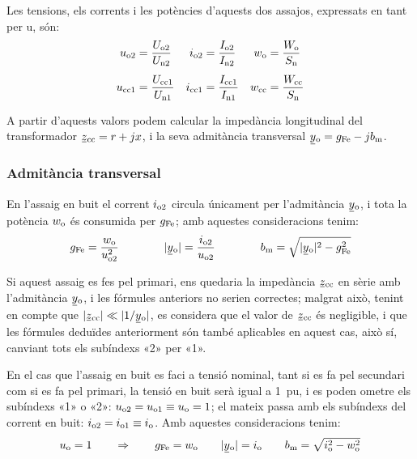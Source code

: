 Les tensions, els corrents i les potències d'aquests dos  assajos,
expressats en tant per u, són:
\begin{align}
    u_\mathrm{o2} &=\frac{U_\mathrm{o2}}{U_\mathrm{n2}} &
    i_\mathrm{o2} &=\frac{I_\mathrm{o2}}{I_\mathrm{n2}} &
    w_\mathrm{o}  &=\frac{W_\mathrm{o}}{S_\mathrm{n}} \\[1ex]
    u_\mathrm{cc1} &=\frac{U_\mathrm{cc1}}{U_\mathrm{n1}} &
    i_\mathrm{cc1} &=\frac{I_\mathrm{cc1}}{I_\mathrm{n1}} &
    w_\mathrm{cc} &=\frac{W_\mathrm{cc}}{S_\mathrm{n}}
\end{align}

A partir d'aquests valors podem calcular la impedància longitudinal
del transformador $\cmplx{z}\ped{cc}=r+j x$, i la seva admitància
transversal $\cmplx{y}\ped{o}=g\ped{Fe}-j b\ped{m}$.

\subsubsection{Admitància transversal}

En l'assaig en buit el corrent $i_\mathrm{o2}$ circula
únicament per l'admitància $\cmplx{y}\ped{o}$, i tota la potència
$w_\mathrm{o}$ és consumida per $g_\mathrm{Fe}$; amb aquestes consideracions
tenim:
\begin{equation}
    g\ped{Fe} = \frac{w\ped{o}}{u\ped{o2}^2} \qquad\qquad
    |\cmplx{y}\ped{o}| = \frac{i\ped{o2}}{u\ped{o2}}
    \qquad\qquad
    b\ped{m} = \sqrt{|\cmplx{y}\ped{o}|^2 - g\ped{Fe}^2}
\end{equation}

Si aquest assaig es fes pel primari, ens quedaria la impedància
$\cmplx{z}\ped{cc}$ en sèrie amb l'admitància $\cmplx{y}\ped{o}$, i les fórmules anteriors no serien correctes; malgrat això,
tenint en compte que $|\cmplx{z}\ped{cc}| \ll |1/\cmplx{y}\ped{o}|$,
es  considera que el valor de $\cmplx{z}\ped{cc}$ és negligible, i
que les fórmules deduïdes anteriorment són també aplicables en
aquest cas, això sí, canviant tots els subíndexs «2» per «1».

En el cas que l'assaig en buit es faci a tensió nominal, tant  si es
fa pel secundari com si es fa pel primari, la tensió en buit serà
igual a \qty{1}{pu}, i es poden ometre els subíndexs «1» o «2»:
$u_\mathrm{o2} = u_\mathrm{o1} \equiv u_\mathrm{o} = 1$; el mateix passa amb els
subíndexs del corrent en buit: $i_\mathrm{o2} = i_\mathrm{o1} \equiv
i_\mathrm{o}$. Amb aquestes consideracions tenim:
\begin{equation}
    u\ped{o} = 1 \qquad \Rightarrow \qquad g\ped{Fe} = w\ped{o} \qquad
    |\cmplx{y}\ped{o}| = i\ped{o} \qquad
    b\ped{m} = \sqrt{i\ped{o}^2 - w\ped{o}^2}
    \label{eq:assaig-buit-nomianl}
\end{equation}

